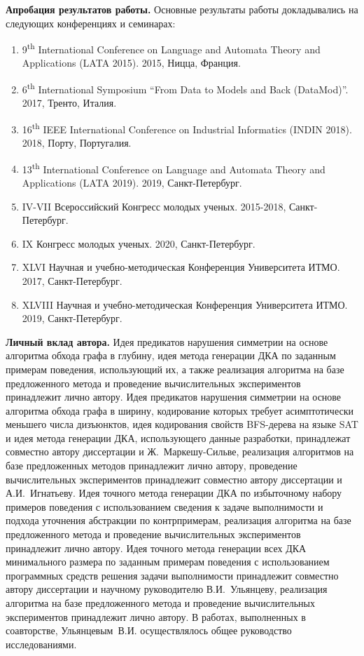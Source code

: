 \textbf{Апробация результатов работы.}
Основные результаты работы докладывались на следующих конференциях и семинарах:
\begin{enumerate}
  \item 9\textsuperscript{th} International Conference on Language and Automata Theory and Applications (LATA 2015). 2015, Ницца, Франция.
  \item 6\textsuperscript{th} International Symposium ``From Data to Models and Back (DataMod)''. 2017, Тренто, Италия.
  \item 16\textsuperscript{th} IEEE International Conference on Industrial Informatics (INDIN 2018). 2018, Порту, Португалия.
  \item 13\textsuperscript{th} International Conference on Language and Automata Theory and Applications (LATA 2019). 2019, Санкт-Петербург.
  \item IV-VII Всероссийский Конгресс молодых ученых. 2015-2018, Санкт-Петербург.
  \item IX Конгресс молодых ученых. 2020, Санкт-Петербург.
  \item XLVI Научная и учебно-методическая Конференция Университета \mbox{ИТМО}. 2017, Санкт-Петербург.
  \item XLVIII Научная и учебно-методическая Конференция Университета ИТМО. 2019, Санкт-Петербург.
\end{enumerate}

\textbf{Личный вклад автора.}
Идея предикатов нарушения симметрии на основе алгоритма обхода графа в глубину, идея метода генерации ДКА по заданным примерам поведения, использующий их, а также реализация алгоритма на базе предложенного метода и проведение вычислительных экспериментов принадлежит лично автору.
Идея предикатов нарушения симметрии на основе алгоритма обхода графа в ширину, кодирование которых требует асимптотически меньшего числа дизъюнктов, идея кодирования свойств BFS-дерева на языке SAT и идея метода генерации ДКА, использующего данные разработки, принадлежат совместно автору диссертации и Ж.~Маркешу-Сильве, реализация алгоритмов на базе предложенных методов принадлежит лично автору, проведение вычислительных экспериментов принадлежит совместно автору диссертации и А.И.~Игнатьеву.
Идея точного метода генерации ДКА по избыточному набору примеров поведения с использованием сведения к задаче выполнимости и подхода уточнения абстракции по контрпримерам, реализация алгоритма на базе предложенного метода и проведение вычислительных экспериментов принадлежит лично автору.
Идея точного метода генерации всех ДКА минимального размера по заданным примерам поведения с использованием программных средств решения задачи выполнимости принадлежит совместно автору диссертации и научному руководителю В.И.~Ульянцеву, реализация алгоритма на базе предложенного метода и проведение вычислительных экспериментов принадлежит лично автору.
В работах, выполненных в соавторстве, Ульянцевым~В.И. осуществлялось общее руководство исследованиями.

